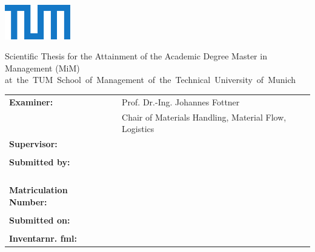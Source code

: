 

\makeatletter
\newcommand{\Titelblatt}{%
	\begin{titlepage}
	\raggedbottom
	\begin{flushright}	
	\includegraphics[height=15mm]{./resources/TUM_Logo_blau.pdf} \\ [1ex]
	\end{flushright}

		\begin{LARGE}		
                \raggedright
			\@title \par 
		\end{LARGE}
			
		\begin{Large}
                \raggedright
			\@subtitle \par
		\end{Large}

		\vspace{50 pt}
		
		\begin{large}
			Scientific Thesis for the Attainment of the Academic Degree \newline
			\arbeitstyp Master in Management (MiM) \newline
			\mbox{at the TUM School of Management of the Technical University of Munich}
		\end{large}
	
		\vspace{20 pt}

		\begin{table}[h]
			\hskip-0.2cm
			\begin{tabular}{lll}
				\textbf{Examiner:} &  & Prof. Dr.-Ing. Johannes Fottner \\
				&  & Chair of Materials Handling, Material Flow, Logistics \\
				\textbf{Supervisor:}&  & \Betreuer \\
				&  &  \\
				\textbf{Submitted by:} &  & \@author \\
				&  & \adresseI \\
				&  & \adresseII \\
				&  & \telnr \\
				&  & \\
        		\textbf{Matriculation Number:} &  & \matriculation \\
				& & \\
				\textbf{Submitted on:} &  & \abgabetermin{} \\
				& & \\
				\textbf{Inventarnr. fml:}& & \Arbeitsnummer \\
			\end{tabular}
		\end{table}

	 
	\end{titlepage}

}
\makeatother

\Titelblatt

	

